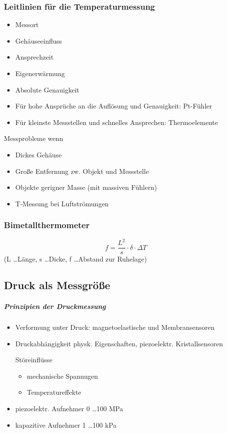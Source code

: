\documentclass[a4paper]{scrartcl}
\begin{document}
\subsubsection{Leitlinien für die Temperaturmessung}
\begin{itemize}
\item Messort
\item Gehäuseeinfluss
\item Ansprechzeit
\item Eigenerwärmung
\item Absolute Genauigkeit
\item Für hohe Ansprüche an die Auflösung und Genauigkeit: Pt-Fühler
\item Für kleinste Messstellen und schnelles Ansprechen: Thermoelemente 
\end{itemize}
Messprobleme wenn
\begin{itemize}
\item Dickes Gehäuse
\item Große Entfernung zw. Objekt und Messstelle
\item Objekte gerigner Masse (mit massiven Fühlern)
\item T-Messung bei Luftströmungen
\end{itemize}

\subsubsection{Bimetallthermometer}
\[f = \frac{L^2}{s} \cdot \delta \cdot \Delta T \]
(L \dots Länge, s \dots Dicke, f \dots Abstand zur Ruhelage)

\subsection{Druck als Messgröße}
\subparagraph{Prinzipien der Druckmessung}
\begin{itemize}
\item Verformung unter Druck: magnetoelastische und Membransensoren
\item Druckabhängigkeit physk. Eigenschaften, piezoelektr. Kristallsensoren

Störeinflüsse
\begin{itemize}
\item mechanische Spannugen
\item Temperatureffekte
\end{itemize}
\item piezoelektr. Aufnehmer 0 \dots 100 MPa
\item kapazitive Aufnehmer 1 \dots 100 kPa
\end{itemize}
\end{document}
